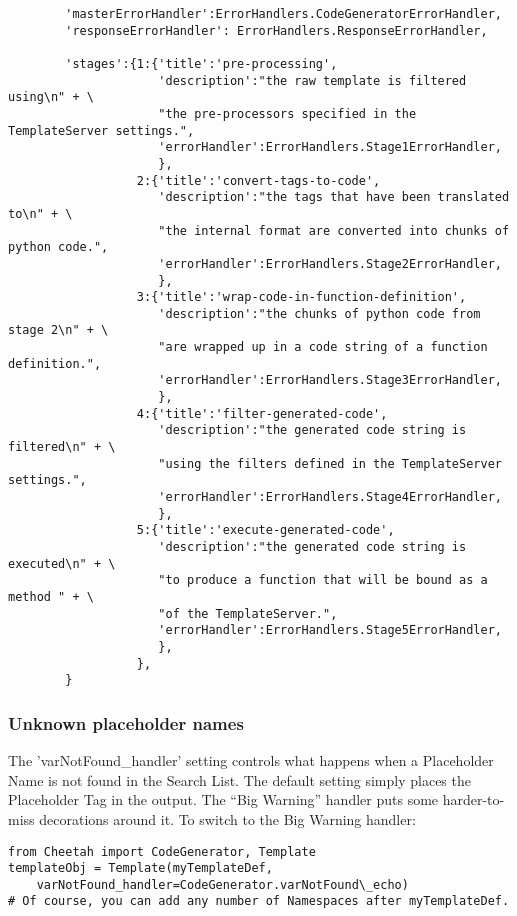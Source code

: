 \begin{verbatim}
        'masterErrorHandler':ErrorHandlers.CodeGeneratorErrorHandler,
        'responseErrorHandler': ErrorHandlers.ResponseErrorHandler,

        'stages':{1:{'title':'pre-processing',
                     'description':"the raw template is filtered using\n" + \
                     "the pre-processors specified in the TemplateServer settings.",
                     'errorHandler':ErrorHandlers.Stage1ErrorHandler,
                     },
                  2:{'title':'convert-tags-to-code',
                     'description':"the tags that have been translated to\n" + \
                     "the internal format are converted into chunks of python code.",
                     'errorHandler':ErrorHandlers.Stage2ErrorHandler,
                     },
                  3:{'title':'wrap-code-in-function-definition',
                     'description':"the chunks of python code from stage 2\n" + \
                     "are wrapped up in a code string of a function definition.",
                     'errorHandler':ErrorHandlers.Stage3ErrorHandler,
                     },
                  4:{'title':'filter-generated-code',
                     'description':"the generated code string is filtered\n" + \
                     "using the filters defined in the TemplateServer settings.",
                     'errorHandler':ErrorHandlers.Stage4ErrorHandler,
                     },
                  5:{'title':'execute-generated-code',
                     'description':"the generated code string is executed\n" + \
                     "to produce a function that will be bound as a method " + \
                     "of the TemplateServer.",
                     'errorHandler':ErrorHandlers.Stage5ErrorHandler,
                     },
                  },
        }
\end{verbatim}

\subsubsection{Unknown placeholder names}

The 'varNotFound\_handler' setting controls what happens when a Placeholder
Name is not found in the Search List.  The default setting simply places the
Placeholder Tag in the output.  The ``Big Warning'' handler puts some
harder-to-miss decorations around it.  To switch to the Big Warning handler:

\begin{verbatim}
from Cheetah import CodeGenerator, Template
templateObj = Template(myTemplateDef, 
	varNotFound_handler=CodeGenerator.varNotFound\_echo)
# Of course, you can add any number of Namespaces after myTemplateDef.
\end{verbatim}

